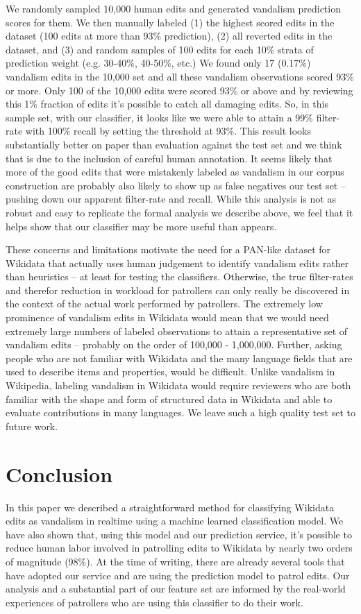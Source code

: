 \documentclass{sig-alternate}
\begin{document}
We randomly sampled 10,000 human edits and generated vandalism prediction scores for them.  We then manually labeled (1) the highest scored edits in the dataset (100 edits at more than 93\% prediction), (2) all reverted edits in the dataset, and (3) and random samples of 100 edits for each 10\% strata of prediction weight (e.g. 30-40\%, 40-50\%, etc.)  We found only 17 (0.17\%) vandalism edits in the 10,000 set and all these vandalism observations scored 93\% or more. Only 100 of the 10,000 edits were scored 93\% or above and by reviewing this 1\% fraction of edits it's possible to catch all damaging edits. So, in this sample set, with our classifier, it looks like we were able to attain a 99\% filter-rate with 100\% recall by setting the threshold at 93\%.  This result looks substantially better on paper than evaluation against the test set and we think that is due to the inclusion of careful human annotation. It seems likely that more of the good edits that were mistakenly labeled as vandalism in our corpus construction are probably also likely to show up as false negatives our test set -- pushing down our apparent filter-rate and recall. While this analysis is not as robust and easy to replicate the formal analysis we describe above, we feel that it helps show that our classifier may be more useful than appears.

These concerns and limitations motivate the need for a PAN-like dataset for Wikidata that actually uses human judgement to identify vandalism edits rather than heuristics -- at least for testing the classifiers. Otherwise, the true filter-rates and therefor reduction in workload for patrollers can only really be discovered in the context of the actual work performed by patrollers. The extremely low prominence of vandalism edits in Wikidata would mean that we would need extremely large numbers of labeled observations to attain a representative set of vandalism edits -- probably on the order of 100,000 - 1,000,000. Further, asking people who are not familiar with Wikidata and the many language fields that are used to describe items and properties, would be difficult. Unlike vandalism in Wikipedia, labeling vandalism in Wikidata would require reviewers who are both familiar with the shape and form of structured data in Wikidata and able to evaluate contributions in many languages. We leave such a high quality test set to future work.

\section{Conclusion}
In this paper we described a straightforward method for classifying Wikidata edits as vandalism in realtime using a machine learned classification model. We have also shown that, using this model and our prediction service, it's possible to reduce human labor involved in patrolling edits to Wikidata by nearly two orders of magnitude (98\%). At the time of writing, there are already several tools that have adopted our service and are using the prediction model to patrol edits. Our analysis and a substantial part of our feature set are informed by the real-world experiences of patrollers who are using this classifier to do their work.
\end{document}
